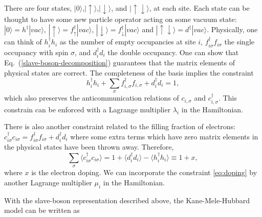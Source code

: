 \documentclass[aps,prb,twocolumn,superscriptaddress,showpacs]{revtex4-1}
\begin{document}
There are four states, $|0\rangle$,$|\uparrow\rangle$,$|\downarrow\rangle$, and $|\uparrow \downarrow\rangle$, at each site.  Each state can be thought to have some new particle operator acting on some vacuum state: $|0\rangle = h^{\dag} |vac\rangle $,  $|\uparrow \rangle = f^{\dag}_{\uparrow} |vac\rangle $, $ |\downarrow\rangle = f^{\dag}_{\downarrow} |vac\rangle $ and $ |\uparrow \downarrow\rangle = d^{\dag}|vac\rangle $.  Physically, one can think of $h^{\dag}_i h_i$ as the number of empty occupancies at site $i$, $f^{\dag}_{i\sigma}f_{i\sigma}$ the single occupancy with spin $\sigma$, and $d^{\dag}_i d_i$ the double occupancy. One can show that Eq.~(\ref{slave-boson-decomposition}) guarantees that the matrix elements of physical states are correct. The completeness of the basis implies the constraint
\begin{equation}
\label{constrain-completeness}
h^{\dag}_i h_i+\sum_\sigma f^{\dag}_{i,\sigma}f_{i,\sigma}+d^{\dag}_i d_i=1,
\end{equation}
which also preserves the anticommunication relations of $c_{i,\sigma}$ and $c^{\dag}_{i,\sigma}$. This constrain can be enforced with a Lagrange multiplier $\lambda_i$ in the Hamiltonian.

There is also another constraint related to the filling fraction of electrons: $
c^{\dag}_{i\sigma}c_{i\sigma}=f^{\dag}_{i\sigma}f_{i\sigma}+d^{\dag}_id_i $
where some extra terms which have zero matrix elements in the physical states have been thrown away.\cite{Barnes:jpf76,Coleman:prb84,Zou:prb88,Wen:rmp06,Vaezi:10} Therefore,
\begin{equation}
\label{eq:doping}
\sum_{\sigma} \langle c^{\dag}_{i\sigma}c_{i\sigma} \rangle=1+\langle d^{\dag}_id_i \rangle - \langle h^{\dag}_ih_i\rangle\equiv 1+x,
\end{equation}
where $x$ is the electron doping. We can incorporate the constraint \eqref{eq:doping} by another Lagrange multiplier $\mu_i$ in the Hamiltonian.

With the slave-boson representation described above, the Kane-Mele-Hubbard model can be written as
\end{document}
